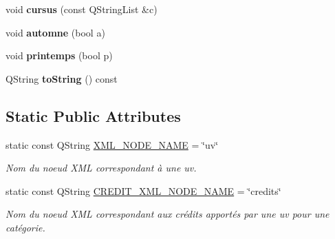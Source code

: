 \begin{DoxyCompactItemize}
\item 
\hypertarget{classUV_adaf893cc83cc4fa8c0c6ba20a35d1a76}{void {\bfseries cursus} (const Q\+String\+List \&c)}\label{classUV_adaf893cc83cc4fa8c0c6ba20a35d1a76}

\item 
\hypertarget{classUV_af54b2e6bfc9ea527aa01ae6023057cad}{void {\bfseries automne} (bool a)}\label{classUV_af54b2e6bfc9ea527aa01ae6023057cad}

\item 
\hypertarget{classUV_ae861b75787135b56b3ee36b42bd45e37}{void {\bfseries printemps} (bool p)}\label{classUV_ae861b75787135b56b3ee36b42bd45e37}

\item 
\hypertarget{classUV_abf2d72f28de424d3d0d3df7fa339f869}{Q\+String {\bfseries to\+String} () const }\label{classUV_abf2d72f28de424d3d0d3df7fa339f869}

\end{DoxyCompactItemize}
\subsection*{Static Public Attributes}
\begin{DoxyCompactItemize}
\item 
\hypertarget{classUV_a3d0a7fd96f0bb15ad0e23365cec09e13}{static const Q\+String \hyperlink{classUV_a3d0a7fd96f0bb15ad0e23365cec09e13}{X\+M\+L\+\_\+\+N\+O\+D\+E\+\_\+\+N\+A\+M\+E} = \char`\"{}uv\char`\"{}}\label{classUV_a3d0a7fd96f0bb15ad0e23365cec09e13}

\begin{DoxyCompactList}\small\item\em Nom du noeud X\+M\+L correspondant à une uv. \end{DoxyCompactList}\item 
\hypertarget{classUV_afef2ca86c5d563602d2ef39a3a08841e}{static const Q\+String \hyperlink{classUV_afef2ca86c5d563602d2ef39a3a08841e}{C\+R\+E\+D\+I\+T\+\_\+\+X\+M\+L\+\_\+\+N\+O\+D\+E\+\_\+\+N\+A\+M\+E} = \char`\"{}credits\char`\"{}}\label{classUV_afef2ca86c5d563602d2ef39a3a08841e}

\begin{DoxyCompactList}\small\item\em Nom du noeud X\+M\+L correspondant aux crédits apportés par une uv pour une catégorie. \end{DoxyCompactList}\end{DoxyCompactItemize}



